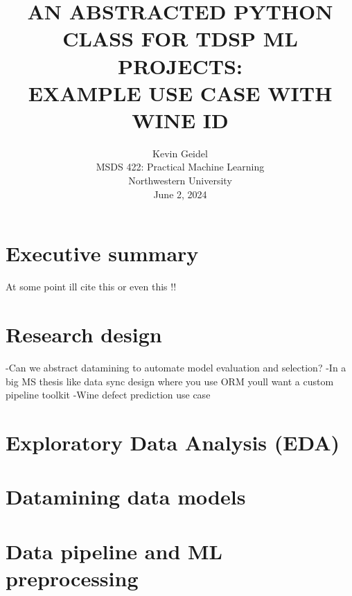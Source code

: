 \documentclass[12pt,letterpaper]{article}
\begin{document}
\selectfont
{}
\doublespacing
\setlength{\droptitle}{1in} 

\title{\large{AN ABSTRACTED PYTHON CLASS FOR TDSP ML PROJECTS: \\ EXAMPLE USE CASE WITH WINE ID \\\vspace{1.2in}}}

\author{
Kevin Geidel \\
MSDS 422: Practical Machine Learning \\
Northwestern University \\
June 2, 2024 \\
}

\date{}
\maketitle
\thispagestyle{empty}	
\clearpage
\setcounter{page}{1}

\section{Executive summary}
\tab At some point ill cite this \citep{tdsp:2024} or even this \citep{Hyatt:2024}!!

\section{Research design}
\tab 
-Can we abstract datamining to automate model evaluation and selection?
-In a big MS thesis like data sync design where you use ORM youll want a custom pipeline toolkit 
-Wine defect prediction use case

\section{Exploratory Data Analysis (EDA)}
\tab 

\section{Datamining data models}

\section{Data pipeline and ML preprocessing}
\tab 
\end{document}
